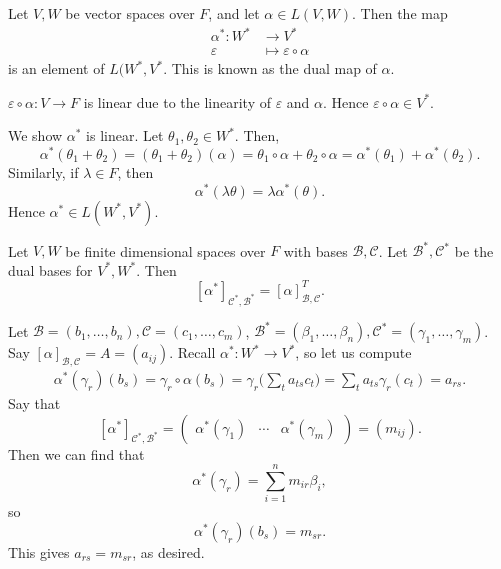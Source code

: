 \documentclass[12pt]{article}
\begin{document}
\begin{definition}
	Let $V, W$ be vector spaces over $F$, and let $\alpha \in L(V, W)$. Then the map
	\begin{align*}
		\alpha^{\ast} : W^{\ast} &\to V^{\ast} \\
		\varepsilon &\mapsto \varepsilon \circ \alpha
	\end{align*}
	is an element of $L(W^{\ast}, V^{\ast}$. This is known as the dual map of $\alpha$.
\end{definition}

\begin{proofbox}
	$\varepsilon \circ \alpha : V \to F$ is linear due to the linearity of $\varepsilon$ and $\alpha$. Hence $\varepsilon \circ \alpha \in V^{\ast}$.

We show $\alpha^{\ast}$ is linear. Let $\theta_1, \theta_2 \in W^{\ast}$. Then,
\[
	\alpha^{\ast}(\theta_1 + \theta_2) = (\theta_1 + \theta_2)(\alpha) = \theta_1 \circ \alpha + \theta_2 \circ \alpha = \alpha^{\ast} (\theta_1) + \alpha^{\ast}(\theta_2)
.\]
Similarly, if $\lambda \in F$, then
\[
	\alpha^{\ast}(\lambda \theta) = \lambda \alpha^{\ast}(\theta)
.\]
Hence $\alpha^{\ast} \in L(W^{\ast}, V^{\ast})$.
\end{proofbox}

\begin{proposition}
	Let $V, W$ be finite dimensional spaces over $F$ with bases $\mathcal{B}, \mathcal{C}$. Let $\mathcal{B}^{\ast}, \mathcal{C}^{\ast}$ be the dual bases for $V^{\ast}, W^{\ast}$. Then
	\[
		[\alpha^{\ast}]_{\mathcal{C}^{\ast}, \mathcal{B}^{\ast}} = [\alpha]_{\mathcal{B},\mathcal{C}}^{T}
	.\]
\end{proposition}

\begin{proofbox}
	Let $\mathcal{B} = (b_1, \ldots, b_n), \mathcal{C} = (c_1, \ldots, c_m)$, $\mathcal{B}^{\ast} = (\beta_1, \ldots, \beta_n), \mathcal{C}^{\ast} = (\gamma_1, \ldots, \gamma_m)$. Say $[\alpha]_{\mathcal{B}, \mathcal{C}} = A = (a_{ij})$. Recall $\alpha^{\ast} : W^{\ast} \to V^{\ast}$, so let us compute
	\begin{align*}
		\alpha^{\ast}(\gamma_r)(b_s) = \gamma_r \circ \alpha(b_s) = \gamma_r \Biggl( \sum_{t} a_{ts} c_t \Biggr) = \sum_{t} a_{ts} \gamma_r(c_t) = a_{rs}.
	\end{align*}
	Say that
	\[
		[\alpha^{\ast}]_{\mathcal{C}^{\ast}, \mathcal{B}^{\ast}} = 
		\begin{pmatrix}
			\alpha^{\ast}(\gamma_1) & \cdots & \alpha^{\ast}(\gamma_m)
		\end{pmatrix}
		= (m_{ij})
	.\]
	Then we can find that
	\[
		\alpha^{\ast}(\gamma_r) = \sum_{i = 1}^{n} m_{ir}\beta_i
	,\]
	so
	\[
		\alpha^{\ast}(\gamma_r)(b_s) = m_{sr}
	.\]
	This gives $a_{rs} = m_{sr}$, as desired.
\end{proofbox}
\end{document}
